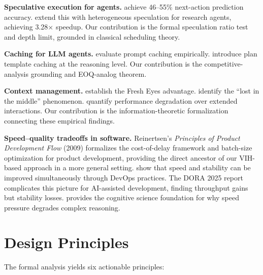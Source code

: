\documentclass[11pt,a4paper]{article}
\theoremstyle{definition}
\theoremstyle{remark}
\begin{document}
\textbf{Speculative execution for agents.} \citet{zhou2025speculative} achieve 46--55\% next-action prediction accuracy. \citet{ji2026dualspec} extend this with heterogeneous speculation for research agents, achieving 3.28$\times$ speedup. Our contribution is the formal speculation ratio test and depth limit, grounded in classical scheduling theory.

\textbf{Caching for LLM agents.} \citet{liang2026cache} evaluate prompt caching empirically. \citet{zhang2025apc} introduce plan template caching at the reasoning level. Our contribution is the competitive-analysis grounding and EOQ-analog theorem.

\textbf{Context management.} \citet{suzgun2024metaprompting} establish the Fresh Eyes advantage. \citet{liu2024lost} identify the ``lost in the middle'' phenomenon. \citet{agentdrift2026} quantify performance degradation over extended interactions. Our contribution is the information-theoretic formalization connecting these empirical findings.

\textbf{Speed--quality tradeoffs in software.} Reinertsen's \emph{Principles of Product Development Flow} (2009) formalizes the cost-of-delay framework and batch-size optimization for product development, providing the direct ancestor of our VIH-based approach in a more general setting. \citet{forsgren2018accelerate} show that speed and stability can be improved simultaneously through DevOps practices. The DORA 2025 report \citep{dora2025} complicates this picture for AI-assisted development, finding throughput gains but stability losses. \citet{kahneman2011thinking} provides the cognitive science foundation for why speed pressure degrades complex reasoning.


\section{Design Principles}\label{sec:principles}

The formal analysis yields six actionable principles:
\end{document}
